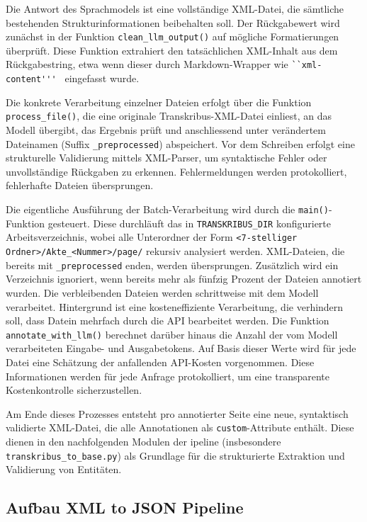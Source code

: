 \documentclass[12pt, a4paper, ngerman, bidi=default]{article}
\newcommand{\code}[1]{\colorbox{VeryLightGray}{\texttt{#1}}} %
\begin{document}
Die Antwort des Sprachmodels ist eine vollständige XML-Datei, die sämtliche bestehenden Strukturinformationen beibehalten soll. 
Der Rückgabewert wird zunächst in der Funktion \code{clean\_llm\_output()} auf mögliche Formatierungen überprüft. Diese Funktion 
extrahiert den tatsächlichen XML-Inhalt aus dem Rückgabestring, etwa wenn dieser durch Markdown-Wrapper wie \code{\texttt{\char\`{}\`{}xml-content\'{}\'{}\'{}}
} eingefasst wurde. 

Die konkrete Verarbeitung einzelner Dateien erfolgt über die Funktion \code{process\_file()}, die eine originale Transkribus-XML-Datei einliest,
an das Modell übergibt, das Ergebnis prüft und anschliessend unter verändertem Dateinamen (Suffix \code{\_preprocessed}) abspeichert. Vor dem 
Schreiben erfolgt eine strukturelle Validierung mittels XML-Parser, um syntaktische Fehler oder unvollständige Rückgaben zu 
erkennen. Fehlermeldungen werden protokolliert, fehlerhafte Dateien übersprungen.

Die eigentliche Ausführung der Batch-Verarbeitung wird durch die \code{main()}-Funktion gesteuert. Diese durchläuft das in 
\code{TRANSKRIBUS\_DIR} konfigurierte Arbeitsverzeichnis, wobei alle Unterordner der Form \code{<7-stelliger Ordner>/Akte\_<Nummer>/page/} 
rekursiv analysiert werden. XML-Dateien, die bereits mit \code{\_preprocessed} enden, werden übersprungen. Zusätzlich wird ein Verzeichnis 
ignoriert, wenn bereits mehr als fünfzig Prozent der Dateien annotiert wurden. Die verbleibenden Dateien werden schrittweise mit dem Modell 
verarbeitet. Hintergrund ist eine kosteneffiziente Verarbeitung, die verhindern soll, dass Datein mehrfach durch die API bearbeitet werden. Die Funktion 
\code{annotate\_with\_llm()} berechnet darüber hinaus die Anzahl der vom Modell verarbeiteten Eingabe- und Ausgabetokens. Auf Basis dieser Werte wird für 
jede Datei eine Schätzung der anfallenden API-Kosten vorgenommen. Diese Informationen werden für jede Anfrage protokolliert, um eine transparente 
Kostenkontrolle sicherzustellen.

Am Ende dieses Prozesses entsteht pro annotierter Seite eine neue, syntaktisch validierte XML-Datei, 
die alle Annotationen als \code{custom}-Attribute enthält. Diese dienen in den nachfolgenden Modulen der 
ipeline (insbesondere \code{transkribus\_to\_base.py}) als Grundlage für die strukturierte Extraktion und Validierung von Entitäten.

\subsection{Aufbau XML to JSON Pipeline}
\end{document}
